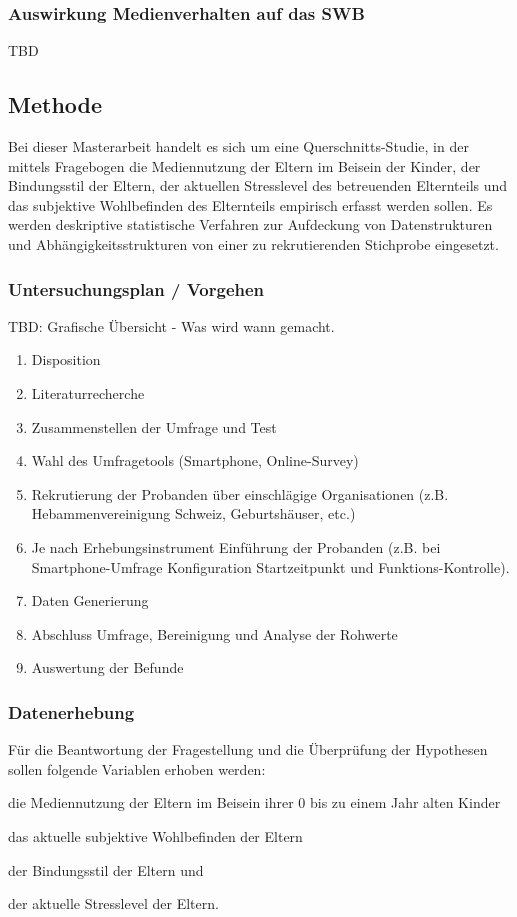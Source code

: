 \subsubsection{Auswirkung Medienverhalten auf das SWB}
TBD

\subsection{Methode}
Bei dieser Masterarbeit handelt es sich um eine Querschnitts-Studie, in der mittels Fragebogen die Mediennutzung der Eltern im Beisein der Kinder, der Bindungsstil der Eltern, der aktuellen Stresslevel des betreuenden Elternteils und das subjektive Wohlbefinden des Elternteils empirisch erfasst werden sollen. 
Es werden deskriptive statistische Verfahren zur Aufdeckung von Datenstrukturen und Abhängigkeitsstrukturen von einer zu rekrutierenden Stichprobe eingesetzt.
\subsubsection{Untersuchungsplan / Vorgehen}
TBD: Grafische Übersicht - Was wird wann gemacht.
\begin{enumerate}
    \item Disposition
    \item Literaturrecherche
    \item Zusammenstellen der Umfrage und Test
    \item Wahl des Umfragetools (Smartphone, Online-Survey)
    \item Rekrutierung der Probanden über einschlägige Organisationen (z.B. Hebammenvereinigung Schweiz, Geburtshäuser, etc.)
    \item Je nach Erhebungsinstrument Einführung der Probanden (z.B. bei Smartphone-Umfrage Konfiguration Startzeitpunkt und Funktions-Kontrolle).
    \item Daten Generierung
    \item Abschluss Umfrage, Bereinigung und Analyse der Rohwerte
    \item Auswertung der Befunde
\end{enumerate}
\subsubsection{Datenerhebung}
Für die Beantwortung der Fragestellung und die Überprüfung der Hypothesen sollen folgende Variablen erhoben werden: 
\begin{seriate}
    \item die Mediennutzung der Eltern im Beisein ihrer 0 bis zu einem Jahr alten Kinder
    \item das aktuelle subjektive Wohlbefinden der Eltern
    \item der Bindungsstil der Eltern und
    \item der aktuelle Stresslevel der Eltern.
\end{seriate}

